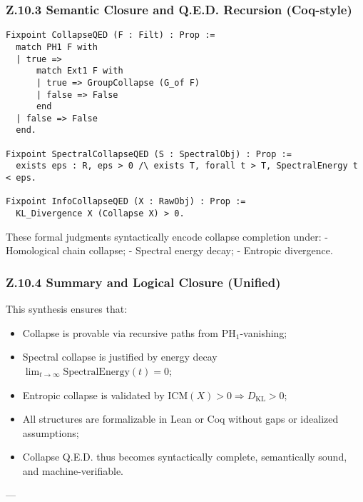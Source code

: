 \documentclass[11pt]{article}
\begin{document}
\subsubsection*{Z.10.3 Semantic Closure and Q.E.D. Recursion (Coq-style)}

\begin{lstlisting}[language=Coq, mathescape=false]
Fixpoint CollapseQED (F : Filt) : Prop :=
  match PH1 F with
  | true =>
      match Ext1 F with
      | true => GroupCollapse (G_of F)
      | false => False
      end
  | false => False
  end.

Fixpoint SpectralCollapseQED (S : SpectralObj) : Prop :=
  exists eps : R, eps > 0 /\ exists T, forall t > T, SpectralEnergy t < eps.

Fixpoint InfoCollapseQED (X : RawObj) : Prop :=
  KL_Divergence X (Collapse X) > 0.
\end{lstlisting}

These formal judgments syntactically encode collapse completion under:
- Homological chain collapse;
- Spectral energy decay;
- Entropic divergence.


\subsubsection*{Z.10.4 Summary and Logical Closure (Unified)}

This synthesis ensures that:
\begin{itemize}
    \item Collapse is provable via recursive paths from \( \mathrm{PH}_1 \)-vanishing;
    \item Spectral collapse is justified by energy decay \( \lim_{t \to \infty} \mathrm{SpectralEnergy}(t) = 0 \);
    \item Entropic collapse is validated by \( \mathrm{ICM}(X) > 0 \Rightarrow D_{\mathrm{KL}} > 0 \);
    \item All structures are formalizable in Lean or Coq without gaps or idealized assumptions;
    \item Collapse Q.E.D. thus becomes syntactically complete, semantically sound, and machine-verifiable.
\end{itemize}


---

\end{document}
